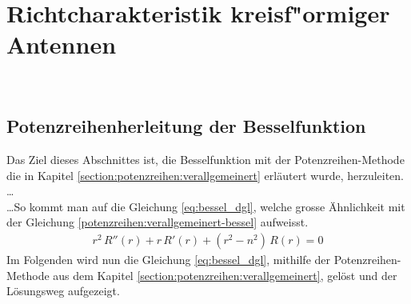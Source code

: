 \chapter{Richtcharakteristik kreisf"ormiger Antennen\label{chapter:kreis}}
\begin{refsection}
\\
%
%
%
%
%
\section{Potenzreihenherleitung der Besselfunktion}
Das Ziel dieses Abschnittes ist, die Besselfunktion mit der Potenzreihen-Methode die in Kapitel \ref{section:potenzreihen:verallgemeinert} erl\"autert wurde, herzuleiten.
\dots \\
%
\dots So kommt man auf die Gleichung \ref{eq:bessel_dgl}, welche grosse \"Ahnlichkeit mit der Gleichung \ref{potenzreihen:verallgemeinert-bessel} aufweisst.
\begin{align}
	r^2 \, R'' \left( r \right)
	+
	r \, R' \left( r \right)
	+
	\left( r^2 - n^2 \right) \, R \left( r \right)
	=
	0
	\label{eq:bessel_dgl}
\end{align}
Im Folgenden wird nun die Gleichung \ref{eq:bessel_dgl}, mithilfe der Potenzreihen-Methode aus dem Kapitel \ref{section:potenzreihen:verallgemeinert}, gel\"ost und der L\"osungsweg aufgezeigt.

\end{refsection}

